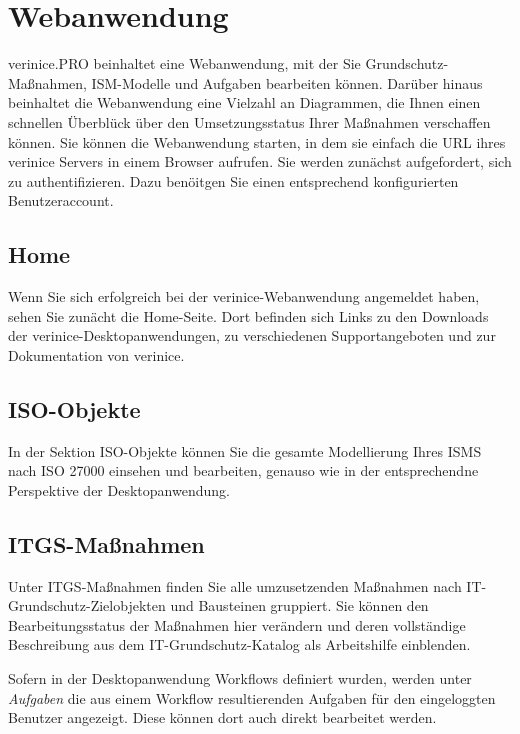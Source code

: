\documentclass[a4paper,10pt]{book}
\begin{document}
\section{Webanwendung}
\label{webanwendung}

verinice.PRO beinhaltet eine Webanwendung, mit der Sie Grundschutz-Maßnahmen,
ISM-Modelle und Aufgaben bearbeiten können. Darüber hinaus beinhaltet die
Webanwendung eine Vielzahl an Diagrammen, die Ihnen einen schnellen Überblück
über den Umsetzungsstatus Ihrer Maßnahmen verschaffen können. Sie können die
Webanwendung starten, in dem sie einfach die URL ihres verinice Servers in einem
Browser aufrufen. Sie werden zunächst aufgefordert, sich zu authentifizieren.
Dazu benöitgen Sie einen entsprechend konfigurierten Benutzeraccount.


\subsection{Home}

Wenn Sie sich erfolgreich bei der verinice-Webanwendung angemeldet haben, sehen
Sie zunächt die Home-Seite. Dort befinden sich Links zu den Downloads der
verinice-Desktopanwendungen, zu verschiedenen Supportangeboten und zur
Dokumentation von verinice.


\subsection{ISO-Objekte}

In der Sektion ISO-Objekte können Sie die gesamte Modellierung Ihres ISMS nach
ISO 27000 einsehen und bearbeiten, genauso wie in der entsprechendne Perspektive
der Desktopanwendung.


\subsection{ITGS-Maßnahmen}

Unter ITGS-Maßnahmen finden Sie alle umzusetzenden Maßnahmen nach
IT-Grundschutz-Zielobjekten und Bausteinen gruppiert. Sie können den
Bearbeitungsstatus der Maßnahmen hier verändern und deren vollständige
Beschreibung aus dem IT-Grundschutz-Katalog als Arbeitshilfe einblenden.

Sofern in der Desktopanwendung Workflows definiert wurden, werden unter
\textit{Aufgaben} die aus einem Workflow resultierenden Aufgaben für den
eingeloggten Benutzer angezeigt. Diese können dort auch direkt bearbeitet
werden.
\end{document}
